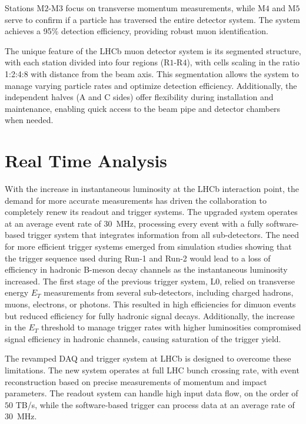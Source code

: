 Stations M$2$-M$3$ focus on transverse momentum measurements, while M$4$ and M$5$ serve to confirm if a particle has traversed the entire detector system. The system achieves a 95\% detection efficiency, providing robust muon identification. 

The unique feature of the LHCb muon detector system is its segmented structure, with each station divided into four regions (R$1$-R$4$), with cells scaling in the ratio 1:2:4:8 with distance from the beam axis. This segmentation allows the system to manage varying particle rates and optimize detection efficiency. Additionally, the independent halves (A and C sides) offer flexibility during installation and maintenance, enabling quick access to the beam pipe and detector chambers when needed.


\section{Real Time Analysis}\label{sec:rta}

With the increase in instantaneous luminosity at the LHCb interaction point, the demand for more accurate measurements has driven the collaboration to completely renew its readout and trigger systems. The upgraded system operates at an average event rate of \SI{30}{\mega\hertz}, processing every event with a fully software-based trigger system that integrates information from all sub-detectors. The need for more efficient trigger systems emerged from simulation studies showing that the trigger sequence used during Run-1 and Run-2 would lead to a loss of efficiency in hadronic B-meson decay channels as the instantaneous luminosity increased\cite{CERN-LHCC-2011-001}. The first stage of the previous trigger system, L$0$, relied on transverse energy $E_T$ measurements from several sub-detectors, including charged hadrons, muons, electrons, or photons. This resulted in high efficiencies for dimuon events but reduced efficiency for fully hadronic signal decays. Additionally, the increase in the $E_T$ threshold to manage trigger rates with higher luminosities compromised signal efficiency in hadronic channels, causing saturation of the trigger yield.

The revamped DAQ and trigger system at LHCb is designed to overcome these limitations\cite{CERN-LHCC-2018-014}. The new system operates at full LHC bunch crossing rate, with event reconstruction based on precise measurements of momentum and impact parameters. The readout system can handle high input data flow, on the order of $50$ TB/s, while the software-based trigger can process data at an average rate of \SI{30}{\mega\hertz}. 

